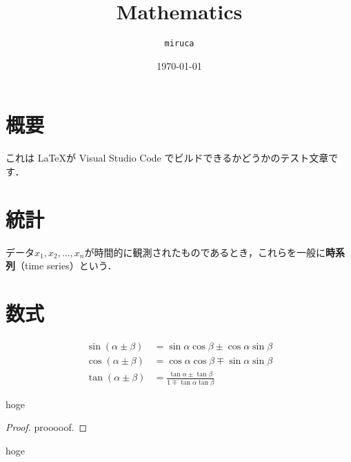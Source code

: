 \documentclass[dvipdfmx,uplatex]{jsarticle}
\begin{document}
\title{Mathematics}
\author{\texttt{miruca}}
\date{\today}
\maketitle

\section{概要}
これは \LaTeX が Visual Studio Code でビルドできるかどうかのテスト文章です．

\section{統計}
データ$x_1,x_2,\dots,x_n$が時間的に観測されたものであるとき，これらを一般に\textbf{時系列}（time series）という．

\section{数式}
\begin{align}
    \sin(\alpha \pm \beta) &= \sin \alpha \cos \beta \pm \cos \alpha \sin \beta \\
    \cos(\alpha \pm \beta) &= \cos \alpha \cos \beta \mp \sin \alpha \sin \beta \\
    \tan(\alpha \pm \beta) &= \frac{\tan \alpha \pm \tan \beta}{1 \mp \tan \alpha \tan \beta}
\end{align}

\begin{defbox}
    \begin{definition}
      hoge
    \end{definition}
\end{defbox}

\begin{proof}
    prooooof.  
\end{proof}
%
\vspace{\baselineskip}
\begin{theorembox}
    \begin{theorem}
      hoge
    \end{theorem}
\end{theorembox}
\end{document}
